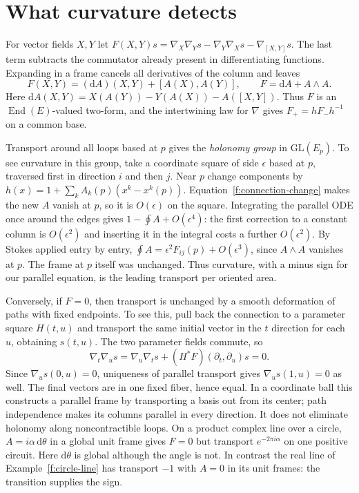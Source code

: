 \section{What curvature detects}

\begin{definition}[Curvature]\label{f:curvature}
For vector fields $X,Y$ let $F(X,Y)s=\nabla_X\nabla_Ys-\nabla_Y\nabla_Xs-\nabla_{[X,Y]}s$. The last term subtracts the commutator already present in differentiating functions. Expanding in a frame cancels all derivatives of the column and leaves
\[
 F(X,Y)=(\mathrm dA)(X,Y)+[A(X),A(Y)],\qquad F=\mathrm dA+A\wedge A .
\]
Here $\mathrm dA(X,Y)=X(A(Y))-Y(A(X))-A([X,Y])$. Thus $F$ is an $\operatorname{End}(E)$-valued two-form, and the intertwining law for $\nabla$ gives $F_+=h F_-h^{-1}$ on a common base.
\end{definition}

Transport around all loops based at $p$ gives the \emph{holonomy group} in $\mathrm{GL}(E_p)$. To see curvature in this group, take a coordinate square of side $\epsilon$ based at $p$, traversed first in direction $i$ and then $j$. Near $p$ change components by $h(x)=1+\sum_k A_k(p)(x^k-x^k(p))$. Equation~\eqref{f:connection-change} makes the new $A$ vanish at $p$, so it is $O(\epsilon)$ on the square. Integrating the parallel ODE once around the edges gives $1-\oint A+O(\epsilon^4)$: the first correction to a constant column is $O(\epsilon^2)$ and inserting it in the integral costs a further $O(\epsilon^2)$. By Stokes applied entry by entry, $\oint A=\epsilon^2 F_{ij}(p)+O(\epsilon^3)$, since $A\wedge A$ vanishes at $p$. The frame at $p$ itself was unchanged. Thus curvature, with a minus sign for our parallel equation, is the leading transport per oriented area.

Conversely, if $F=0$, then transport is unchanged by a smooth deformation of paths with fixed endpoints. To see this, pull back the connection to a parameter square $H(t,u)$ and transport the same initial vector in the $t$ direction for each $u$, obtaining $s(t,u)$. The two parameter fields commute, so
\[
 \nabla_t\nabla_u s=\nabla_u\nabla_t s+(H^*F)(\partial_t,\partial_u)s=0 .
\]
Since $\nabla_u s(0,u)=0$, uniqueness of parallel transport gives $\nabla_u s(1,u)=0$ as well. The final vectors are in one fixed fiber, hence equal. In a coordinate ball this constructs a parallel frame by transporting a basis out from its center; path independence makes its columns parallel in every direction. It does not eliminate holonomy along noncontractible loops. On a product complex line over a circle, $A=i\alpha\,\mathrm d\theta$ in a global unit frame gives $F=0$ but transport $e^{-2\pi i\alpha}$ on one positive circuit. Here $\mathrm d\theta$ is global although the angle is not. In contrast the real line of Example~\ref{f:circle-line} has transport $-1$ with $A=0$ in its unit frames: the transition supplies the sign.

